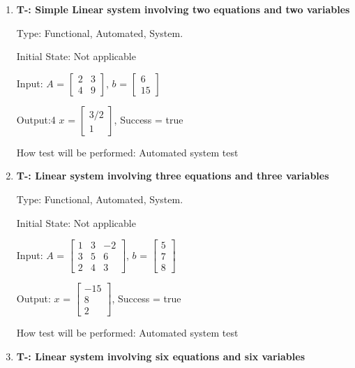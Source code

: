 \documentclass[12pt, titlepage]{article}
\newcounter{tnum}
\begin{document}
\begin{enumerate}

\item{\textbf{T-\thetnum \label{t-gauss
elimination_simple}: Simple Linear system involving two equations and two
variables}}


Type: Functional, Automated, System.
					
Initial State: Not applicable
					
Input: $A$ = $\begin{bmatrix} 
2 & 3 \\
4 & 9 
\end{bmatrix}$, $b$ = $\begin{bmatrix} 
6 \\
15 
\end{bmatrix}$

Output:4 $x$ = $\begin{bmatrix} 
3/2\\
1
\end{bmatrix}$, Success = true
					
How test will be performed: Automated system test
					
\item{\textbf{T-\thetnum \label{t-gaussian
elimination_three}: Linear system involving three equations and three
variables}}

Type: Functional, Automated, System.
					
Initial State: Not applicable
					
Input: $A$ =  $\begin{bmatrix} 
1 & 3 & -2 \\
3 & 5 & 6\\
2 & 4 & 3
\end{bmatrix}$, $b$ = $\begin{bmatrix} 
5\\
7\\
8 
\end{bmatrix}$
					
Output: $x$ = $\begin{bmatrix} 
-15\\
8\\
2 
\end{bmatrix}$, Success = true
					
How test will be performed: Automated system test

\item{\textbf{T-\thetnum \label{t-gaussian
elimination_five}: Linear system involving six equations and six variables}}


\end{enumerate}
\end{document}
